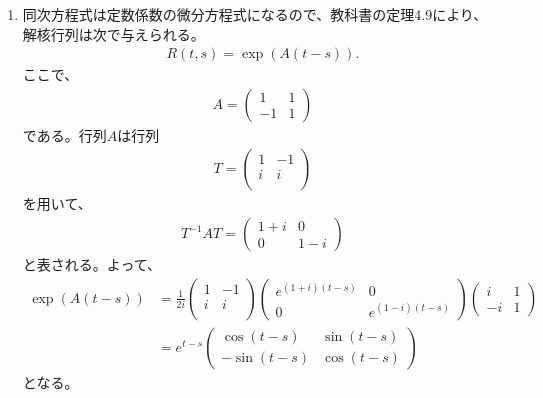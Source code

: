 \documentclass{jsarticle}
\begin{document}
\begin{enumerate}
\item 同次方程式は定数係数の微分方程式になるので、教科書の定理4.9により、
解核行列は次で与えられる。
\begin{align}
R(t,s)=\exp(A(t-s)).
\end{align}
ここで、
\begin{align}
A=\left(
\begin{array}{cc}
1 & 1\\
-1 & 1
\end{array}
\right)
\end{align}
である。行列$A$は行列
\begin{align}
T=\left(
\begin{array}{cc}
1 & -1\\
i & i\\
\end{array}
\right)
\end{align}
を用いて、
\begin{align}
T^{-1}AT=\left(
\begin{array}{cc}
1+i & 0\\
0 & 1-i
\end{array}
\right)
\end{align}
と表される。よって、
\begin{align}
\exp(A(t-s))&=
\frac{1}{2i}\left(
\begin{array}{cc}
1 & -1\\
i & i\\
\end{array}
\right)\left(
\begin{array}{cc}
e^{(1+i)(t-s)} & 0\\
0 & e^{(1-i)(t-s)}
\end{array}
\right)\left(
\begin{array}{cc}
i & 1\\
-i & 1
\end{array}
\right)\\
&=e^{t-s}\left(
\begin{array}{cc}
\cos(t-s) & \sin(t-s)\\
-\sin(t-s) & \cos(t-s)
\end{array}
\right)
\end{align}
となる。


\end{enumerate}
\end{document}
